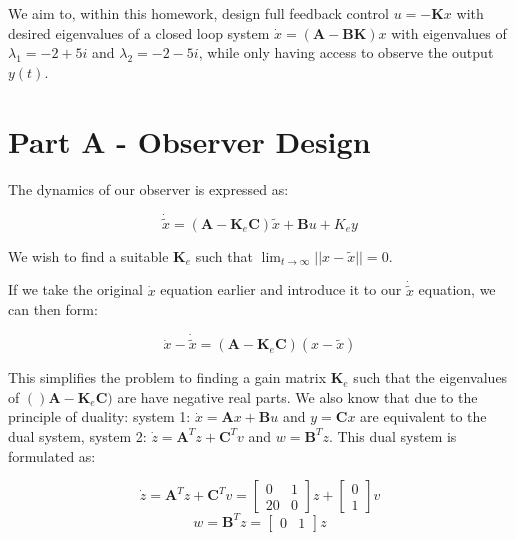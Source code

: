 \documentclass{article}
\begin{document}
We aim to, within this homework, design full feedback control $u=-\boldsymbol{K}x$ with desired eigenvalues of a closed loop system $\dot{x}=(\boldsymbol{A}-\boldsymbol{B}\boldsymbol{K})x$ with eigenvalues of $\lambda_1 = -2+5i$ and $\lambda_2= -2-5i$, while only having access to observe the output $y(t)$.

\section*{Part A - Observer Design}
The dynamics of our observer is expressed as:

\begin{equation}
    \dot{\tilde{x}} = (\boldsymbol{A}-\boldsymbol{K}_e \boldsymbol{C})\tilde{x}+\boldsymbol{B}u+K_e y
\end{equation}

We wish to find a suitable $\boldsymbol{K}_e$ such that $\lim_{t \to \infty} ||x-\tilde{x}||=0$.

If we take the original $\dot{x}$ equation earlier and introduce it to our $\dot{\tilde{x}}$ equation, we can then form:

\begin{equation}
    \dot{x}-\dot{\tilde{x}} = (\boldsymbol{A}-\boldsymbol{K}_e\boldsymbol{C})(x-\tilde{x})
\end{equation}

This simplifies the problem to finding a gain matrix $\boldsymbol{K}_e$ such that the eigenvalues of $()\boldsymbol{A}-\boldsymbol{K}_e\boldsymbol{C})$ are have negative real parts. We also know that due to the principle of duality: system 1: $\dot{x} = \boldsymbol{A}x + \boldsymbol{B}u $ and $y=\boldsymbol{C}x$ are equivalent to the dual system, system 2: $\dot{z}=\boldsymbol{A}^T z + \boldsymbol{C}^T v$ and $w = \boldsymbol{B}^T z$. This dual system is formulated as:

\begin{equation}
    \dot{z}=\boldsymbol{A}^T z + \boldsymbol{C}^T v = \begin{bmatrix}
        0 & 1 \\ 20 & 0
    \end{bmatrix} z + \begin{bmatrix}
        0 \\ 1
    \end{bmatrix} v
\end{equation}
\begin{equation}
    w = \boldsymbol{B}^T z = \begin{bmatrix}
        0 & 1
    \end{bmatrix} z
\end{equation}
\end{document}

